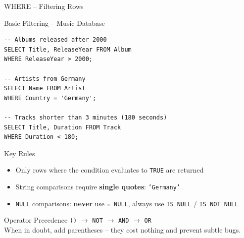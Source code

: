 \begin{frame}[fragile]{WHERE -- Filtering Rows}
  \begin{block}{Basic Filtering -- Music Database}
\begin{lstlisting}[style=sqlstyle]
-- Albums released after 2000
SELECT Title, ReleaseYear FROM Album
WHERE ReleaseYear > 2000;

-- Artists from Germany
SELECT Name FROM Artist
WHERE Country = 'Germany';

-- Tracks shorter than 3 minutes (180 seconds)
SELECT Title, Duration FROM Track
WHERE Duration < 180;
\end{lstlisting}
  \end{block}

  \begin{block}{Key Rules}
    \begin{itemize}
      \item Only rows where the condition evaluates to \texttt{TRUE} are returned
      \item String comparisons require \textbf{single quotes}: \texttt{'Germany'}
      \item \texttt{NULL} comparisons: \textbf{never} use \texttt{= NULL},
            always use \texttt{IS NULL} / \texttt{IS NOT NULL}
    \end{itemize}
  \end{block}

  \begin{block}{Operator Precedence}
    \texttt{()} $\to$ \texttt{NOT} $\to$ \texttt{AND} $\to$ \texttt{OR}\\[2pt]
    When in doubt, add parentheses -- they cost nothing and prevent subtle bugs.
  \end{block}
\end{frame}

